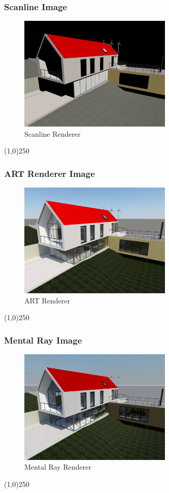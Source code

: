 \begin{frame}
\frametitle{Scanline Image}
\begin{figure}
	\centering
		\includegraphics[height=5.5cm]{img/Rendering/scanline.jpg}
	\caption{Scanline Renderer}
	\label{fig:Scanline}
\end{figure}
\end{frame}
\begin{center}\line(1,0){250}\end{center}


\begin{frame}
\frametitle{ART Renderer Image}
\begin{figure}
	\centering
	\includegraphics[height=5.5cm]{img/Rendering/ARTRenderer.jpg}
	\caption{ART Renderer}
	\label{fig:ARTRenderer}
\end{figure}
\end{frame}
\begin{center}\line(1,0){250}\end{center}






\begin{frame}
\frametitle{Mental Ray Image}
\begin{figure}
	\centering
		\includegraphics[height=5.5cm]{img/Rendering/MentalRay.jpg}
	\caption{Mental Ray Renderer}
	\label{fig:MentalRay}
\end{figure}
\end{frame}
\begin{center}\line(1,0){250}\end{center}



